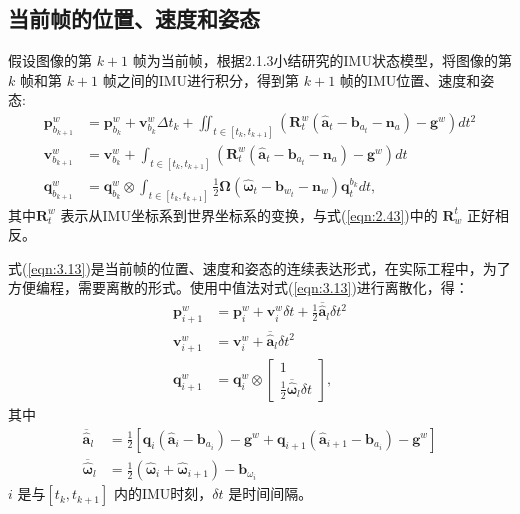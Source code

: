 \subsection{当前帧的位置、速度和姿态}
假设图像的第 $k+1$  帧为当前帧，根据2.1.3小结研究的IMU状态模型，将图像的第 $k$  帧和第 $k+1$  帧之间的IMU进行积分，得到第 $k+1$ 帧的IMU位置、速度和姿态:
\begin{equation}
\label{eqn:3.13}
\begin{split}
\mathbf{p}_{b_{k+1}}^w&=\mathbf{p}_{b_k}^w+\mathbf{v}_{b_k}^w\Delta t_k+\iint_{t\in[t_k,t_{k+1}]}(\mathbf{R}_t^w(\hat{\mathbf{a}}_t-\mathbf{b}_{a_t}-\mathbf{n}_a)-\mathbf{g}^w)dt^2 \\
\mathbf{v}_{b_{k+1}}^w&=\mathbf{v}_{b_k}^w+\int_{t\in[t_k,t_{k+1}]}(\mathbf{R}_t^w(\hat{\mathbf{a}}_t-\mathbf{b}_{a_t}-\mathbf{n}_a)-\mathbf{g}^w)dt \\
\mathbf{q}_{b_{k+1}}^w&=\mathbf{q}_{b_k}^w \otimes \int_{t\in[t_k,t_{k+1}]}\frac{1}{2}\bm{\Omega}(\hat{\bm{\omega}}_t-\mathbf{b}_{w_t}-\mathbf{n}_w)\mathbf{q}_t^{b_k}dt,
\end{split}
\end{equation}
其中$\mathbf{R}_t^w $ 表示从IMU坐标系到世界坐标系的变换，与式(\ref{eqn:2.43})中的 $\mathbf{R}_w^t $ 正好相反。

式(\ref{eqn:3.13})是当前帧的位置、速度和姿态的连续表达形式，在实际工程中，为了方便编程，需要离散的形式。使用中值法对式(\ref{eqn:3.13})进行离散化，得：
\begin{equation}
\label{eqn:3.14}
\begin{split}
\mathbf{p}_{{i+1}}^w&=\mathbf{p}_{i}^w+\mathbf{v}_{i}^w\delta t+\frac{1}{2} \overline{\hat{\mathbf{a}}}_{l} \delta t ^{2} \\
\mathbf{v}_{{i+1}}^w&=\mathbf{v}_{i}^w+ \overline{\hat{\mathbf{a}}}_{l} \delta t^{2}\\
\mathbf{q}_{{i+1}}^w&=\mathbf{q}_{i}^w\otimes \begin{bmatrix} 1\\ \frac{1}{2} \overline{\hat{\bm{\omega}}}_{l} \delta t\end{bmatrix},
\end{split}
\end{equation}
其中
\begin{equation}
\label{eqn:3.15}
\begin{aligned}
\overline{\hat{\mathbf{a}}}_{l} &= \frac{1}{2}\left[\mathbf{q}_{i}\left(\hat{ \mathbf{a}}_{i}-\mathbf{b}_{a_{i}}\right)-\mathbf{g}^{w}+\mathbf{q}_{i+1}\left(\hat{\mathbf{a}}_{i+1}-\mathbf{b}_{a_{i}}\right)-\mathbf{g}^{w}\right] \\ 
\overline{\hat{{\bm{\omega}}}}_{l}   &= \frac{1}{2}\left(\hat{\bm{\omega}}_{i}+\hat{\bm{\omega}}_{i+1}\right)-\mathbf{b}_{\omega_{i}}
\end{aligned}
\end{equation}
$i$ 是与$[t_k,t_{k+1}] $ 内的IMU时刻，$\delta t $ 是时间间隔。
